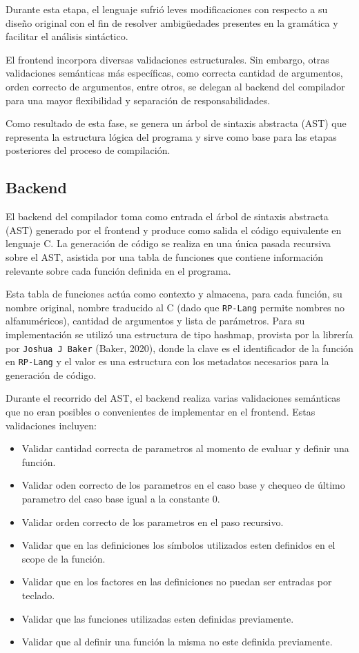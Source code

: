 \documentclass{article}
\newcommand{\rplang}{\texttt{RP-Lang}}
\begin{document}
Durante esta etapa, el lenguaje sufrió leves modificaciones con respecto a su diseño original con el fin de resolver ambigüedades presentes en la gramática y facilitar el análisis sintáctico.

El frontend incorpora diversas validaciones estructurales. Sin embargo, otras validaciones semánticas más específicas, como correcta cantidad de argumentos, orden correcto de argumentos, entre otros, se delegan al backend del compilador para una mayor flexibilidad y separación de responsabilidades.

Como resultado de esta fase, se genera un árbol de sintaxis abstracta (AST) que representa la estructura lógica del programa y sirve como base para las etapas posteriores del proceso de compilación.

\subsection {Backend}

El backend del compilador toma como entrada el árbol de sintaxis abstracta (AST) generado por el frontend y produce como salida el código equivalente en lenguaje C. La generación de código se realiza en una única pasada recursiva sobre el AST, asistida por una tabla de funciones que contiene información relevante sobre cada función definida en el programa.

Esta tabla de funciones actúa como contexto y almacena, para cada función, su nombre original, nombre traducido al C (dado que \rplang{} permite nombres no alfanuméricos), cantidad de argumentos y lista de parámetros. Para su implementación se utilizó una estructura de tipo hashmap, provista por la librería por \texttt{Joshua J Baker} (Baker, 2020), donde la clave es el identificador de la función en \rplang{} y el valor es una estructura con los metadatos necesarios para la generación de código.

Durante el recorrido del AST, el backend realiza varias validaciones semánticas que no eran posibles o convenientes de implementar en el frontend. Estas validaciones incluyen:
\begin{itemize}
\item Validar cantidad correcta de parametros al momento de evaluar y definir una función.
\item Validar oden correcto de los parametros en el caso base y chequeo de último parametro del caso base igual a la constante $0$.
\item Validar orden correcto de los parametros en el paso recursivo.
\item Validar que en las definiciones los símbolos utilizados esten definidos en el scope de la función.
\item Validar que en los factores en las definiciones no puedan ser entradas por teclado.
\item Validar que las funciones utilizadas esten definidas previamente.
\item Validar que al definir una función la misma no este definida previamente.
\end{itemize}
\end{document}
